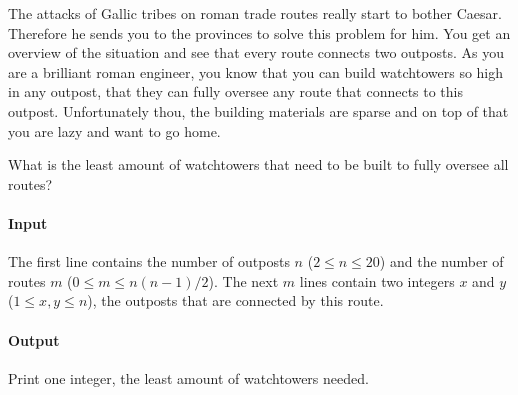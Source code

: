 




The attacks of Gallic tribes on roman trade routes really start to bother Caesar. Therefore he sends you to the provinces to solve this problem for him. You get an overview of the situation and see that every route connects two outposts. As you are a brilliant roman engineer, you know that you can build watchtowers so high in any outpost, that they can fully oversee any route that connects to this outpost. Unfortunately thou, the building materials are sparse and on top of that you are lazy and want to go home.

What is the least amount of watchtowers that need to be built to fully oversee all routes?

\paragraph*{Input}

The first line contains the number of outposts $n$ ($2 \leq n \leq 20$) and the number of routes $m$ ($0 \leq m \leq n(n-1)/2$). The next $m$ lines contain two integers $x$ and $y$ ($1 \leq x,y \leq n$), the outposts that are connected by this route.

\paragraph*{Output}

Print one integer, the least amount of watchtowers needed.

\begin{samples}
\end{samples}


